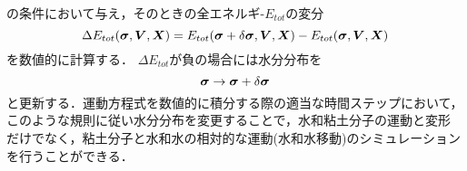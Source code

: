 の条件において与え，そのときの全エネルギ-$E_{tot}$の変分
\begin{equation}
	\Delta E_{tot}(\mbox{\boldmath $\sigma$},\mbox{\boldmath $V$},\mbox{\boldmath $X$})=
	E_{tot}(\mbox{\boldmath $\sigma$}+\delta \mbox{\boldmath $\sigma$},\mbox{\boldmath $V$},\mbox{\boldmath $X$})
	-
	E_{tot}(\mbox{\boldmath $\sigma$},\mbox{\boldmath $V$},\mbox{\boldmath $X$})
	\label{eqn:}
\end{equation}
を数値的に計算する．
$\Delta E_{tot}$が負の場合には水分分布を
\begin{equation}
	\mbox{\boldmath $\sigma$}\rightarrow \mbox{\boldmath $\sigma$}+\delta \mbox{\boldmath $\sigma$}
	\label{eqn:sig_update}
\end{equation}
と更新する．運動方程式を数値的に積分する際の適当な時間ステップにおいて，
このような規則に従い水分分布を変更することで，水和粘土分子の運動と変形
だけでなく，粘土分子と水和水の相対的な運動(水和水移動)のシミュレーション
を行うことができる．
